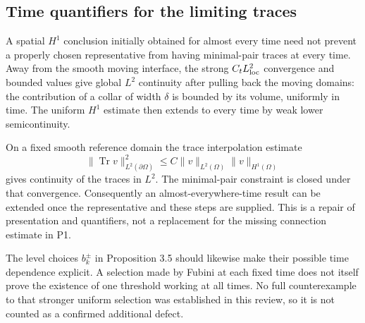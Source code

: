 \documentclass[10pt]{article}
\begin{document}
\subsection*{Time quantifiers for the limiting traces}
A spatial \(H^1\) conclusion initially obtained for almost every time need not prevent a properly chosen representative from having minimal-pair traces at every time. Away from the smooth moving interface, the strong \(C_tL^2_{\rm loc}\) convergence and bounded values give global \(L^2\) continuity after pulling back the moving domains: the contribution of a collar of width \(\delta\) is bounded by its volume, uniformly in time. The uniform \(H^1\) estimate then extends to every time by weak lower semicontinuity.\par
On a fixed smooth reference domain the trace interpolation estimate \[\|\operatorname{Tr}v\|_{L^2(\partial\Omega)}^2
 \leq C\|v\|_{L^2(\Omega)}\|v\|_{H^1(\Omega)}\] gives continuity of the traces in \(L^2\). The minimal-pair constraint is closed under that convergence. Consequently an almost-everywhere-time result can be extended once the representative and these steps are supplied. This is a repair of presentation and quantifiers, not a replacement for the missing connection estimate in P1.\par
The level choices \(b_k^\pm\) in Proposition 3.5 should likewise make their possible time dependence explicit. A selection made by Fubini at each fixed time does not itself prove the existence of one threshold working at all times. No full counterexample to that stronger uniform selection was established in this review, so it is not counted as a confirmed additional defect.\par
\end{document}
